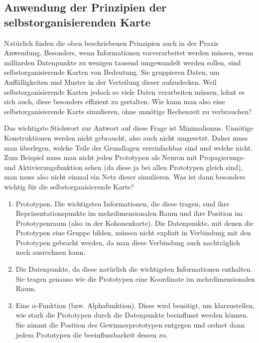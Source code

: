 \documentclass[twoside,a4paper]{article}
\newcommand{\commonlettrine}[1]{\lettrine[nindent=0em,lines=2]{#1}}
\begin{document}
\subsection{Anwendung der Prinzipien der selbstorganisierenden Karte}

\commonlettrine{N}atürlich finden die oben beschriebenen Prinzipien auch in der Praxis Anwendung. Besonders, wenn Informationen vorverarbeitet werden müssen, wenn milliarden Datenpunkte zu wenigen tausend umgewandelt werden sollen, sind selbstorganisierende Karten von Bedeutung. Sie gruppieren Daten, um Auffälligkeiten und Muster in der Verteilung dieser aufzudecken. Weil selbstorganisierende Karten jedoch so viele Daten verarbeiten müssen, lohnt es sich auch, diese besonders effizient zu gestalten. Wie kann man also eine selbstorganisierende Karte simulieren, ohne unnötige Rechenzeit zu verbrauchen?

Das wichtigste Stichwort zur Antwort auf diese Frage ist Minimalismus. Unnötige Konstruktionen werden nicht gebraucht, also auch nicht umgesetzt. Daher muss man überlegen, welche Teile der Grundlagen vereinfachbar sind und welche nicht. Zum Beispiel muss man nicht jeden Prototypen als Neuron mit Propagierungs- und Aktivierungsfunktion sehen (da diese ja bei allen Prototypen gleich sind), man muss also nicht einmal ein Netz dieser simulieren. Was ist dann besonders wichtig für die selbstorganisierende Karte?

\begin{enumerate}
\item Prototypen. Die wichtigsten Informationen, die diese tragen, sind ihre Repräsentationspunkte im mehrdimensionalen Raum und ihre Position im Prototypenraum (also in der Kohonenkarte). Die Datenpunkte, mit denen die Prototypen eine Gruppe bilden, müssen nicht explizit in Verbindung mit den Prototypen gebracht werden, da man diese Verbindung auch nachträglich noch ausrechnen kann.

\item Die Datenpunkte, da diese natürlich die wichtigsten Informationen enthalten. Sie tragen genauso wie die Prototypen eine Koordinate im mehrdimensionalen Raum.

\item Eine \(\alpha\)-Funktion (bzw. Alphafunktion). Diese wird benötigt, um klarzustellen, wie stark die Prototypen durch die Datenpunkte beeinflusst werden können. Sie nimmt die Position des Gewinnerprototypen entgegen und ordnet dann jedem Prototypen die beeinflussbarkeit dessen zu.
\end{enumerate}
\end{document}
